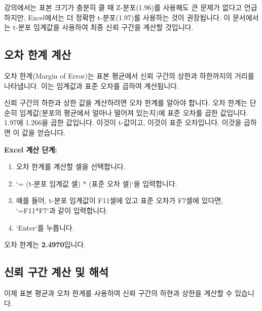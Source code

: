 \documentclass[11pt,a4paper]{article}
\begin{document}
\begin{tcolorbox}[colback=myred!10!white, colframe=myred!75!black, title=중요: Z-분포 vs. t-분포]
강의에서는 표본 크기가 충분히 클 때 Z-분포(1.96)를 사용해도 큰 문제가 없다고 언급하지만, Excel에서는 더 정확한 t-분포(1.97)를 사용하는 것이 권장됩니다. 이 문서에서는 t-분포 임계값을 사용하여 최종 신뢰 구간을 계산할 것입니다.
\end{tcolorbox}

\subsection{오차 한계 계산}

오차 한계(Margin of Error)는 표본 평균에서 신뢰 구간의 상한과 하한까지의 거리를 나타냅니다. 이는 임계값과 표준 오차를 곱하여 계산됩니다.

\begin{tcolorbox}[title=슬라이드 49: 뉴욕 일일 기온 샘플 Excel 시트 (18/22)]
신뢰 구간의 하한과 상한 값을 계산하려면 오차 한계를 알아야 합니다. 오차 한계는 단순히 임계값(분포의 평균에서 얼마나 떨어져 있는지)에 표준 오차를 곱한 값입니다. 1.97에 1.266을 곱한 값입니다. 이것이 t-값이고, 이것이 표준 오차입니다. 이것을 곱하면 이 값을 얻습니다.
\end{tcolorbox}

\textbf{Excel 계산 단계:}
\begin{enumerate}
    \item 오차 한계를 계산할 셀을 선택합니다.
    \item `= (t-분포 임계값 셀) * (표준 오차 셀)`을 입력합니다.
    \item 예를 들어, t-분포 임계값이 F11셀에 있고 표준 오차가 F7셀에 있다면, `=F11*F7`과 같이 입력합니다.
    \item `Enter`를 누릅니다.
\end{enumerate}
\begin{tcolorbox}[colback=mygreen!10!white, colframe=mygreen!75!black, title=계산 결과: 오차 한계]
오차 한계는 \textbf{2.4970}입니다.
\end{tcolorbox}

\subsection{신뢰 구간 계산 및 해석}

이제 표본 평균과 오차 한계를 사용하여 신뢰 구간의 하한과 상한을 계산할 수 있습니다.
\end{document}
